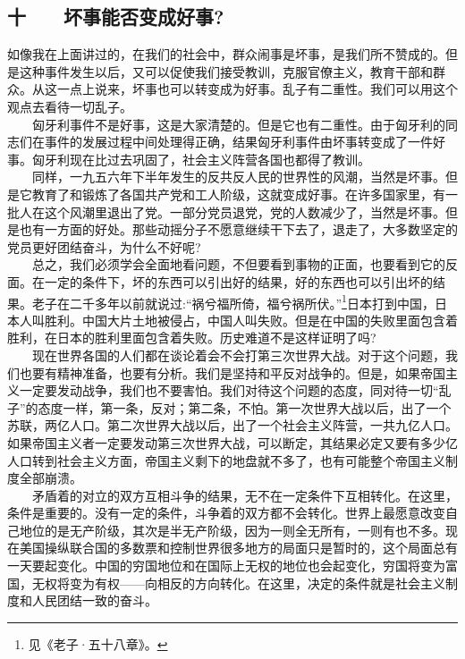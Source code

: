 \documentclass[cn,11pt,chinese]{elegantbook}
\def\myformat#1{\hfil\hfil #1}
\begin{document}
\subsection*{\myformat{十　　坏事能否变成好事?}}
如像我在上面讲过的，在我们的社会中，群众闹事是坏事，是我们所不赞成的。但是这种事件发生以后，又可以促使我们接受教训，克服官僚主义，教育干部和群众。从这一点上说来，坏事也可以转变成为好事。乱子有二重性。我们可以用这个观点去看待一切乱子。\\
　　匈牙利事件不是好事，这是大家清楚的。但是它也有二重性。由于匈牙利的同志们在事件的发展过程中间处理得正确，结果匈牙利事件由坏事转变成了一件好事。匈牙利现在比过去巩固了，社会主义阵营各国也都得了教训。\\
　　同样，一九五六年下半年发生的反共反人民的世界性的风潮，当然是坏事。但是它教育了和锻炼了各国共产党和工人阶级，这就变成好事。在许多国家里，有一批人在这个风潮里退出了党。一部分党员退党，党的人数减少了，当然是坏事。但是也有一方面的好处。那些动摇分子不愿意继续干下去了，退走了，大多数坚定的党员更好团结奋斗，为什么不好呢?\\
　　总之，我们必须学会全面地看问题，不但要看到事物的正面，也要看到它的反面。在一定的条件下，坏的东西可以引出好的结果，好的东西也可以引出坏的结果。老子在二千多年以前就说过:“祸兮福所倚，福兮祸所伏。”\footnote[3]{ 见《老子·五十八章》。}日本打到中国，日本人叫胜利。中国大片土地被侵占，中国人叫失败。但是在中国的失败里面包含着胜利，在日本的胜利里面包含着失败。历史难道不是这样证明了吗?\\
　　现在世界各国的人们都在谈论着会不会打第三次世界大战。对于这个问题，我们也要有精神准备，也要有分析。我们是坚持和平反对战争的。但是，如果帝国主义一定要发动战争，我们也不要害怕。我们对待这个问题的态度，同对待一切“乱子”的态度一样，第一条，反对；第二条，不怕。第一次世界大战以后，出了一个苏联，两亿人口。第二次世界大战以后，出了一个社会主义阵营，一共九亿人口。如果帝国主义者一定要发动第三次世界大战，可以断定，其结果必定又要有多少亿人口转到社会主义方面，帝国主义剩下的地盘就不多了，也有可能整个帝国主义制度全部崩溃。\\
　　矛盾着的对立的双方互相斗争的结果，无不在一定条件下互相转化。在这里，条件是重要的。没有一定的条件，斗争着的双方都不会转化。世界上最愿意改变自己地位的是无产阶级，其次是半无产阶级，因为一则全无所有，一则有也不多。现在美国操纵联合国的多数票和控制世界很多地方的局面只是暂时的，这个局面总有一天要起变化。中国的穷国地位和在国际上无权的地位也会起变化，穷国将变为富国，无权将变为有权——向相反的方向转化。在这里，决定的条件就是社会主义制度和人民团结一致的奋斗。\\
\end{document}

